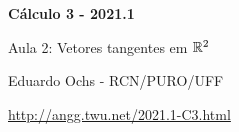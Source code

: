 \documentclass[oneside,12pt]{article}
\begin{document}


\long{}
\long{}
\long{}
\long{}
\long{}
\long{}
\long{}
\long{}
\long{}
\long{}
\long{}

\long{}
\long{}

\def\frown{\ensuremath{{=}{(}}}
\def\True {\mathbf{V}}
\def\False{\mathbf{F}}
\def\D    {\displaystyle}

\def\drafturl{http://angg.twu.net/LATEX/2021-1-C3.pdf}
\def\drafturl{http://angg.twu.net/2021.1-C3.html}
\def\draftfooter{\tiny \href{\drafturl}{\jobname{}} \ColorBrown{\shorttoday{} \hours}}



%

\thispagestyle{empty}

\begin{center}

\vspace*{1.2cm}

{\bf \Large Cálculo 3 - 2021.1}

\bsk

Aula 2: Vetores tangentes em $\mathbb{R}^2$

\bsk

Eduardo Ochs - RCN/PURO/UFF

\url{http://angg.twu.net/2021.1-C3.html}

\end{center}
\end{document}

